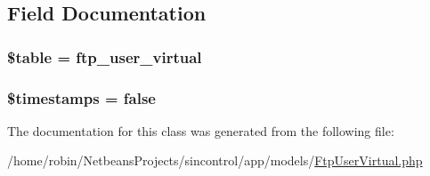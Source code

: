 \subsection{Field Documentation}
\hypertarget{class_ftp_user_virtual_ae8876a14058f368335baccf35af4a22b}{}
\subsubsection[{\$table}]{\setlength{\rightskip}{0pt plus 5cm}\$table = \textquotesingle{}ftp\+\_\+user\+\_\+virtual\textquotesingle{}\hspace{0.3cm}{\ttfamily [protected]}}\label{class_ftp_user_virtual_ae8876a14058f368335baccf35af4a22b}
\hypertarget{class_ftp_user_virtual_a51267c24c8fae742ed8f9be0ba6085ee}{}
\subsubsection[{\$timestamps}]{\setlength{\rightskip}{0pt plus 5cm}\$timestamps = false}\label{class_ftp_user_virtual_a51267c24c8fae742ed8f9be0ba6085ee}


The documentation for this class was generated from the following file\+:\begin{DoxyCompactItemize}
\item 
/home/robin/\+Netbeans\+Projects/sincontrol/app/models/\hyperlink{_ftp_user_virtual_8php}{Ftp\+User\+Virtual.\+php}\end{DoxyCompactItemize}
